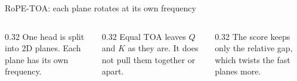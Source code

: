 \documentclass[aspectratio=169,10pt]{beamer}
\newcommand{\thesisfig}[3]{%
  \resizebox{#1}{#2}{}%
}
\begin{document}
\begin{frame}{RoPE-TOA: each plane rotates at its own frequency}
  \centering
  \thesisfig{0.78\textwidth}{!}{../figures/background/rope_rotation.tex}

  \vspace{0.15em}
  \begin{columns}[T,onlytextwidth]
    \begin{column}{0.32\textwidth}
      \centering
      {\small One head is split into 2D planes. Each plane has its own frequency.}
    \end{column}
    \begin{column}{0.32\textwidth}
      \centering
      {\small Equal TOA leaves \(Q\) and \(K\) as they are. It does not pull them together or apart.}
    \end{column}
    \begin{column}{0.32\textwidth}
      \centering
      {\small The score keeps only the relative gap, which twists the fast planes more.}
    \end{column}
  \end{columns}
\end{frame}
\end{document}
